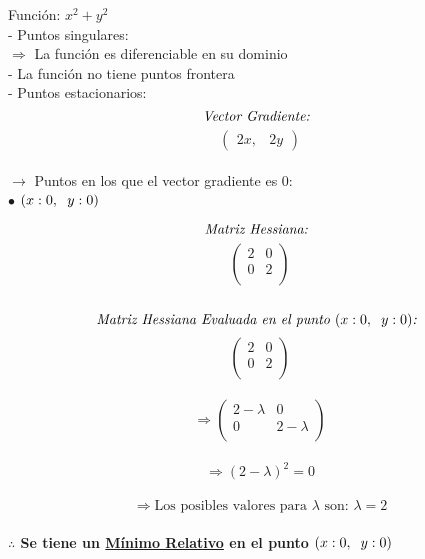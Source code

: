 \documentclass[]{article}
\begin{document}
{\large Función: }$x^{2} + y^{2}$\\

\noindent
- Puntos singulares:\\

\noindent
\hspace{1cm}$\Rightarrow$ La función es diferenciable en su dominio\\

\noindent
- La función no tiene puntos frontera\\

\noindent
- Puntos estacionarios:\\

\[
\text{\textit{Vector Gradiente: }}
\]
\[
\left(
\begin{array}{ccc}
2 x, &
2 y
\end{array}
\right)
\]\\

\noindent
\hspace{1cm}$\rightarrow$ Puntos en los que el vector gradiente es 0:\\

\textbf{\hspace{1cm}$\bullet$ $(x: 0,\hspace{2mm}y: 0)$\\}

\[
\text{\textit{Matriz Hessiana: }}
\]
\[
\left(
\begin{array}{ccc}
2 & 0\\
0 & 2\\
\end{array}
\right)
\]\\

\[
\text{\textit{Matriz Hessiana Evaluada en el punto $(x: 0,\hspace{2mm}y: 0)$: }}
\]
\[
\left(
\begin{array}{ccc}
2 & 0\\
0 & 2\\
\end{array}
\right)
\]\\

\[
\Rightarrow\left(
\begin{array}{ccc}
2 - \lambda & 0\\
0 & 2 - \lambda\\
\end{array}
\right)
\]\\

\[
\Rightarrow \left(2 - \lambda\right)^{2} = 0
\]\\

\[
\Rightarrow \text{Los posibles valores para $\lambda$ son: }\lambda=2
\]\\

\textbf{\hspace{1cm}$\therefore$ Se tiene un \underline{Mínimo Relativo} en el punto $(x: 0,\hspace{2mm}y: 0)$\\}
\end{document}
